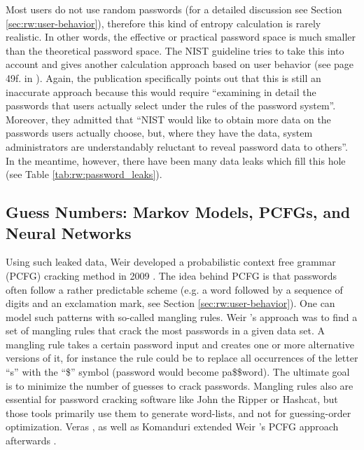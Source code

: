 	Most users do not use random passwords (for a detailed discussion see Section \ref{sec:rw:user-behavior}), therefore this kind of entropy calculation is rarely realistic. In other words, the effective or practical password space is much smaller than the theoretical password space. The NIST guideline tries to take this into account and gives another calculation approach based on user behavior (see page 49f. in \cite{Burr2004NISTEntropy}). Again, the publication specifically points out that this is still an inaccurate approach because this would require ``examining in detail the passwords that users actually select under the rules of the password system''. Moreover, they admitted that ``NIST would like to obtain more data on the passwords users actually choose, but, where	they have the data, system administrators are understandably reluctant to reveal password	data to others''. In the meantime, however, there have been many data leaks which fill this hole (see Table \ref{tab:rw:password_leaks}).
	
	\subsection{Guess Numbers: Markov Models, PCFGs, and Neural Networks}
	
	Using such leaked data, Weir \etal developed a probabilistic context free grammar (PCFG) cracking method in 2009 \cite{Weir2009PCFG}. The idea behind PCFG is that passwords often follow a rather predictable scheme (e.g. a word followed by a sequence of digits and an exclamation mark, see Section \ref{sec:rw:user-behavior}). One can model such patterns with so-called mangling rules. Weir \etal's approach was to find a set of mangling rules that crack the most passwords in a given data set. A mangling rule takes a certain password input and creates one or more alternative versions of it, for instance the rule could be to replace all occurrences of the letter ``s'' with the ``\$'' symbol (password would become pa\$\$word). The ultimate goal is to minimize the number of guesses to crack passwords. Mangling rules also are essential for password cracking software like John the Ripper or Hashcat, but those tools primarily use them to generate word-lists, and not for guessing-order optimization. Veras \etal \cite{Veras2014SemanticPatterns}, as well as Komanduri extended Weir \etal's PCFG approach afterwards \cite{Komanduri2016Dissertation}.

